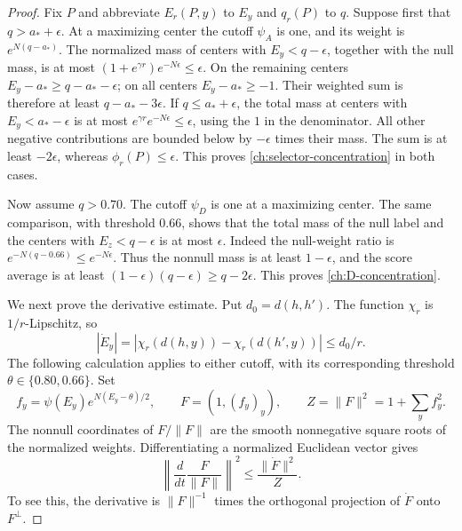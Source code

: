 \begin{proof}
Fix $P$ and abbreviate $E_r(P,y)$ to $E_y$ and $q_r(P)$ to $q$.
Suppose first that $q>a_*+\epsilon$.  At a maximizing center the cutoff
$\psi_A$ is one, and its weight is $e^{N(q-a_*)}$.
The normalized mass of centers with $E_y<q-\epsilon$, together with the
null mass, is at most
$(1+e^{\gamma r})e^{-N\epsilon}\le\epsilon$.
On the remaining centers $E_y-a_*\ge q-a_*-\epsilon$; on all centers
$E_y-a_*\ge-1$.  Their weighted sum is therefore at least
$q-a_*-3\epsilon$.  If $q\le a_*+\epsilon$, the total mass at centers
with $E_y<a_*-\epsilon$ is at most $e^{\gamma r}e^{-N\epsilon}\le\epsilon$,
using the $1$ in the denominator.  All other negative contributions are
bounded below by $-\epsilon$ times their mass.  The sum is at least
$-2\epsilon$, whereas $\phi_r(P)\le\epsilon$.  This proves
\eqref{ch:selector-concentration} in both cases.

Now assume $q>0.70$.  The cutoff $\psi_D$ is one at a maximizing center.
The same comparison, with threshold $0.66$, shows that the total mass of
the null label and the centers with $E_z<q-\epsilon$ is at most $\epsilon$.
Indeed the null-weight ratio is $e^{-N(q-0.66)}\le e^{-N\epsilon}$.
Thus the nonnull mass is at least $1-\epsilon$, and the score average is
at least $(1-\epsilon)(q-\epsilon)\ge q-2\epsilon$.  This proves
\eqref{ch:D-concentration}.

We next prove the derivative estimate.  Put $d_0=d(h,h')$.  The function
$\chi_r$ is $1/r$-Lipschitz, so
\begin{equation}
 |\dot E_y|
 =|\chi_r(d(h,y))-\chi_r(d(h',y))|
 \le d_0/r.
 \label{ch:score-derivative}
\end{equation}
The following calculation applies to either cutoff, with its corresponding
threshold $\theta\in\{0.80,0.66\}$.  Set
\[
 f_y=\psi(E_y)e^{N(E_y-\theta)/2},\qquad
 F=(1,(f_y)_y),\qquad Z=\|F\|^2=1+\sum_y f_y^2.
\]
The nonnull coordinates of $F/\|F\|$ are the smooth nonnegative square
roots of the normalized weights.  Differentiating a normalized Euclidean
vector gives
\begin{equation}
 \left\|\frac{d}{dt}\frac{F}{\|F\|}\right\|^2
 \le\frac{\|\dot F\|^2}{Z}.
 \label{ch:normalization-derivative}
\end{equation}
To see this, the derivative is $\|F\|^{-1}$ times the orthogonal
projection of $\dot F$ onto $F^\perp$.


\end{proof}
